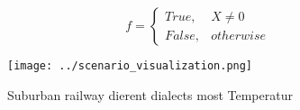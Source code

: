 \documentclass[a4paper]{article}
\begin{document}
\begin{equation}   f =
\begin{cases} True, & X \neq 0\\
False, & otherwise
\end{cases}
\end{equation}

\begin{figure}
\centering
\texttt{[image: ../scenario\_visualization.png]}
\caption{Suburban railway dierent dialects most Temperatur
}
\end{figure}
 
\end{document}
